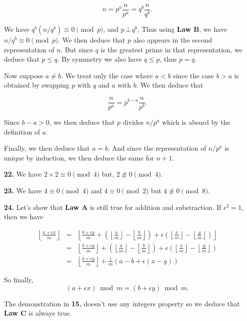 \documentclass[a4paper,12pt]{article}
\newcommand{\newpar}[1]{\bigskip \noindent \textbf{#1.}}
\begin{document}
\[ n = p^a \frac{n}{p^a} = q^b \frac{n}{q^b}.\]

We have $q^b (n/q^b) \equiv 0 \pmod{p}$, and $p\,\bot\,q^b$.  Thus
using \textbf{Law B}, we have $n/q^b \equiv 0 \pmod{p}$.  We then
deduce that $p$ also appears in the second representation of $n$.  But
since $q$ is the greatest prime in that representation, we deduce that
$p\le q$.  By symmetry we also have $q\le p$, thus $p=q$.

Now suppose $a \not= b$.  We treat only the case where $a < b$ since
the case $b > a$ is obtained by swapping $p$ with $q$ and $a$ with
$b$.  We then deduce that

\[ \frac{n}{p^a} = p^{b-a} \frac{n}{p^b}.\]

Since $b-a>0$, we then deduce that $p$ divides $n/p^a$ which is absurd
by the definition of $a$.

Finally, we then deduce that $a=b$.  And since the representation of
$n/p^a$ is unique by induction, we then deduce the same for $n+1$.

\newpar{22} We have $2\times 2 \equiv 0 \pmod{4}$ but, $2\not\equiv 0
\pmod{4}$.

\newpar{23} We have $4 \equiv 0 \pmod{4}$ and $4 \equiv 0 \pmod{2}$
but $4 \not\equiv 0 \pmod{8}$.

\newpar{24} Let's show that \textbf{Law A} is still true for addition
and substraction.  If $\epsilon^2 = 1$, then we have

\begin{eqnarray*}
  \left\lfloor \frac{a+\epsilon x}{m} \right\rfloor &=&
  \left\lfloor \frac{b+\epsilon y}{m} + \left(\left\lfloor
  \frac{a}{m}\right\rfloor - \left\lfloor
  \frac{b}{m}\right\rfloor \right) + \epsilon \left( \left\lfloor
  \frac{x}{m}\right\rfloor - \left\lfloor
  \frac{y}{m}\right\rfloor \right) \right\rfloor \\
  &=&   \left\lfloor \frac{b+\epsilon y}{m} \right\rfloor + \left(\left\lfloor
  \frac{a}{m}\right\rfloor - \left\lfloor
  \frac{b}{m}\right\rfloor \right) + \epsilon \left( \left\lfloor
  \frac{x}{m}\right\rfloor - \left\lfloor
  \frac{y}{m}\right\rfloor \right) \\
  &=&  \left\lfloor \frac{b+\epsilon y}{m} \right\rfloor + \frac{1}{m}
  (a - b + \epsilon(x - y))
\end{eqnarray*}

So finally,
\[ (a+\epsilon x) \bmod{m} = (b+\epsilon y) \bmod{m}.\]

The demonstration in \textbf{15.} doesn't use any integers property so
we deduce that \textbf{Law C} is always true.
\end{document}
